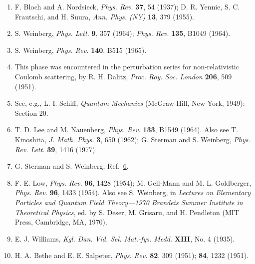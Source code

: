 \begin{enumerate}
\item \label{ref:13.1}F. Bloch and A. Nordsieck, \emph{Phys. Rev.} \textbf{37},
54 (1937); D. R. Yennie, S. C. Frautschi, and H. Suura, \emph{Ann. Phys. (NY)}
\textbf{13}, 379 (1955).

\item \label{ref:13.2}S. Weinberg, \emph{Phys. Lett.} \textbf{9}, 357 (1964);
\emph{Phys. Rev.} \textbf{135}, B1049 (1964).

\item \label{ref:13.3}S. Weinberg, \emph{Phys. Rev.} \textbf{140}, B515
(1965).

\item \label{ref:13.4}This phase was encountered in the perturbation series for
non-relativistic Coulomb scattering, by R. H. Dalitz, \emph{Proc. Roy. Soc.
London} \textbf{206}, 509 (1951).

\item \label{ref:13.5}See, e.g., L. I. Schiff, \emph{Quantum Mechanics}
(McGraw-Hill, New York, 1949): Section 20.

\item \label{ref:13.6}T. D. Lee and M. Nauenberg, \emph{Phys. Rev.}
\textbf{133}, B1549 (1964). Also see T. Kinoshita, \emph{J. Math. Phys.}
\textbf{3}, 650 (1962); G. Sterman and S. Weinberg, \emph{Phys. Rev. Lett.}
\textbf{39}, 1416 (1977).

\item \label{ref:13.7}G. Sterman and S. Weinberg,
Ref.~\hyperref[ref:13.6]{6}.

\item \label{ref:13.8}F. E. Low, \emph{Phys. Rev.} \textbf{96}, 1428 (1954);
M. Gell-Mann and M. L. Goldberger, \emph{Phys. Rev.} \textbf{96}, 1433 (1954).
Also see S. Weinberg, in \emph{Lectures on Elementary Particles and Quantum
Field Theory---1970 Brandeis Summer Institute in Theoretical Physics}, ed. by
S. Deser, M. Grisaru, and H. Pendleton (MIT Press, Cambridge, MA, 1970).

\item \label{ref:13.9}E. J. Williams, \emph{Kgl. Dan. Vid. Sel. Mat.-fys. Medd.}
\textbf{XIII}, No. 4 (1935).

\item \label{ref:13.10}H. A. Bethe and E. E. Salpeter, \emph{Phys. Rev.}
\textbf{82}, 309 (1951); \textbf{84}, 1232 (1951).
\end{enumerate}
